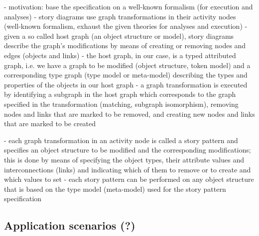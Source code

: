 - motivation: base the specification on a well-known formalism (for execution and analyses)
- story diagrams use graph transformations in their activity nodes (well-known formalism, exhaust the given theories for analyses and execution)
- given a so called host graph (an object structure or model), story diagrams describe the graph's modifications by means of creating or removing nodes and edges (objects and links)
- the host graph, in our case, is a typed attributed graph, i.e. we have a graph to be modified (object structure, token model) and a corresponding type graph (type model or meta-model) describing the types and properties of the objects in our host graph
- a graph transformation is executed by identifying a subgraph in the host graph which corresponds to the graph specified in the transformation (matching, subgraph isomorphism), removing nodes and links that are marked to be removed, and creating new nodes and links that are marked to be created

- each graph transformation in an activity node is called a story pattern and specifies an object structure to be modified and the corresponding modifications; this is done by means of specifying the object types, their attribute values and interconnections (links) and indicating which of them to remove or to create and which values to set
- each story pattern can be performed on any object structure that is based on the type model (meta-model) used for the story pattern specification






\subsection{Application scenarios (?)} \label{sec:Applications}
